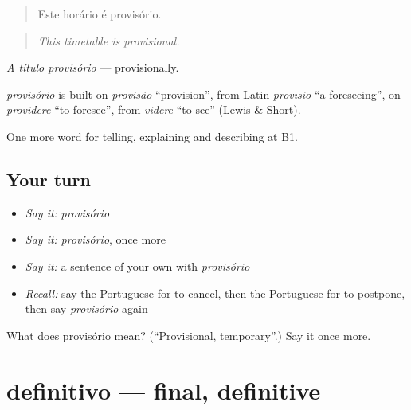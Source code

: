\begin{quote}
Este horário é provisório.
\end{quote}

\begin{quote}
\emph{This timetable is provisional.}
\end{quote}

\emph{A título provisório} — provisionally.

\begin{cousinweb}
\emph{provisório} is built on \emph{provisão} \textquotedblleft{}provision\textquotedblright{}, from Latin \emph{prōvīsiō} \textquotedblleft{}a foreseeing\textquotedblright{}, on \emph{prōvidēre} \textquotedblleft{}to foresee\textquotedblright{}, from \emph{vidēre} \textquotedblleft{}to see\textquotedblright{} (Lewis \& Short).
\end{cousinweb}

\begin{grammarlens}[title={What you've built}]
One more word for telling, explaining and describing at B1.
\end{grammarlens}

\subsection*{Your turn}
\begin{itemize}
\raggedright
  \item \emph{Say it:} \emph{provisório}
  \item \emph{Say it:} \emph{provisório}, once more
  \item \emph{Say it:} a sentence of your own with \emph{provisório}
  \item \emph{Recall:} say the Portuguese for to cancel, then the Portuguese for to postpone, then say \emph{provisório} again
\end{itemize}

\begin{tcolorbox}[breakable,colback=teal!4,colframe=teal!35!black,title={Before you move on}]
What does provisório mean? (\textquotedblleft{}Provisional, temporary\textquotedblright{}.) Say it once more.
\end{tcolorbox}
\section[definitivo]{definitivo — final, definitive}

\label{lesson:PT-C372-definitivo}



